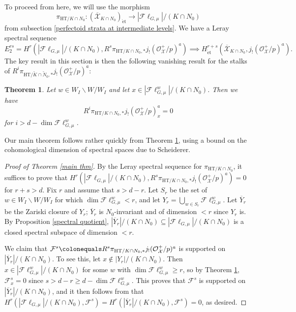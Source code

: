 \documentclass{amsart}
\newtheorem{thm}[subsubsection]{Theorem}
\theoremstyle{remark}
\numberwithin{equation}{subsection}
\newcommand{\cF}{{\mathcal F}}
\newcommand{\cO}{{\mathcal O}}
\newcommand{\cX}{{\mathcal X}}
\newcommand{\HT}{\mathrm{HT}}
\newcommand{\et}{\mathrm{\acute{e}t}}
\newcommand{\Fl}{\mathscr{F}\!\ell}
\newcommand{\tK}{{\widetilde{K}}}
\newcommand{\tN}{\widetilde{N}}
\newcommand{\ocX}{\overline{\mathcal{X}}}
\newcommand{\ol}{\overline}
\newcommand{\sub}{\subseteq}
\newcommand{\defeq}{\colonequals}
\renewcommand{\(}{\left(}
\renewcommand{\)}{\right)}
\begin{document}
\medskip
To proceed from here, we will use the morphism 
\[
\pi_{\HT/K \cap N_{0}} \colon \left(\ocX_{K \cap N_{0}}\right)_{\et} \to |\Fl_{G,\mu}|/(K \cap N_{0})
\]
from subsection \ref{perfectoid strata at intermediate levels}. We have a Leray spectral sequence 
\[
 E_{2}^{rs}=H^{r}(|\Fl_{G,\mu}|/(K \cap N_{0}),R^{s}\pi_{\HT/K \cap N_{0},\ast}j_{!}(\cO_{\cX}^{+}/p)^{a}) \implies H^{r+s}_{\et}(\ocX_{K \cap N_{0}},j_{!}(\cO_{\cX}^{+}/p)^{a}). 
\] 
The key result in this section is then the following vanishing result for the stalks of $R^{i}\pi_{\HT/\tK \cap \tN_0,\ast}j_{!}(\cO_{\cX}^{+}/p)^{a}$:

\begin{thm}\label{bound on higher direct images}
Let $w\in W_{I}\backslash W / W_{I}$ and let $x\in |\Fl_{G,\mu}^{w}|/(K \cap N_{0})$. Then we have 
\[
 R^{i}\pi_{\HT/K \cap N_0,\ast}j_{!}(\cO_{\cX}^{+}/p)_{x}^{a} = 0
 \]
for $i>d-\dim \Fl_{G,\mu}^{w}$.
\end{thm}

Our main theorem follows rather quickly from Theorem \ref{bound on higher direct images}, using a bound on the cohomological dimension of spectral spaces due to Scheiderer.

\begin{proof}[Proof of Theorem \ref{main thm}]
By the Leray spectral sequence for $\pi_{\HT/K \cap N_{0}}$, it suffices to prove that $H^{r}(|\Fl_{G,\mu}|/(K \cap N_{0}),R^{s}\pi_{\HT/K \cap N_{0},\ast}j_{!}(\cO_{\cX}^{+}/p)^{a})=0$ for $r+s>d$. Fix $r$ and assume that $s>d-r$. Let $S_{r}$ be the set of $w\in W_{I}\backslash W /W_{I}$ for which $\dim \Fl^w_{G,\mu} < r$, and let $Y_{r}=\bigcup_{w\in S_{r}}\Fl_{G,\mu}^{w}$. Let $\ol{Y}_r$ be the Zariski closure of $Y_r$; $\ol{Y}_r$ is $N_0$-invariant and of dimension $<r$ since $Y_r$ is. By Proposition \ref{spectral quotient}, $|\ol{Y}_{r}|/(K \cap N_{0}) \sub |\Fl_{G,\mu}|/(K \cap N_{0})$ is a closed spectral subspace of dimension $<r$. 

\medskip

We claim that $\cF^{s} \defeq R^{s}\pi_{\HT/K \cap N_0,\ast}j_{!}(\cO_{\cX}^{+}/p)^{a}$ is supported on $|\ol{Y}_{r}|/(K \cap N_{0})$. To see this, let $x\notin |Y_{r}|/(K \cap N_{0})$. Then $x\in |\Fl_{G,\mu}^{w}|/(K \cap N_{0})$ for some $w$ with $\dim \Fl_{G,\mu}^{w} \geq r$, so by Theorem \ref{bound on higher direct images}, $ \cF_{x}^{s} = 0$ since $s>d-r\geq d-\dim \Fl_{G,\mu}^{w}$. This proves that $\cF^{s}$ is supported on $|\ol{Y}_{r}|/(K \cap N_{0})$, and it then follows from \cite[Corollary 4.6]{scheiderer} that $H^{r}(|\Fl_{G,\mu}|/(K \cap N_{0}),\cF^{s})=H^{r}(|\ol{Y}_{r}|/(K \cap N_{0}),\cF^{s})=0$, as desired.
\end{proof}
\end{document}
